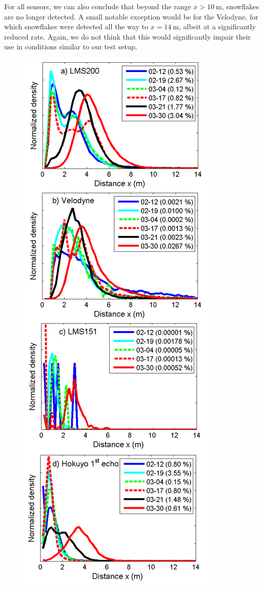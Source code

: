 For all sensors, we can also conclude that beyond the range $x>\SI{10}{\meter}$, snowflakes are no longer detected. A small notable exception would be for the Velodyne, for which snowflakes were detected all the way to $x=\SI{14}{\meter}$, albeit at a significantly reduced rate. Again, we do not think that this would significantly impair their use in conditions similar to our test setup. 


\begin{figure}[th]
    \centering
    \includegraphics[width=0.80\linewidth]{./img/Histograms.png}

\end{figure}
